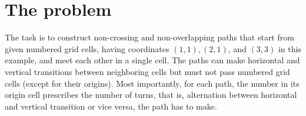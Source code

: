 \section{The problem}
The task is to construct non-crossing and non-overlapping paths that start from given numbered grid cells, having coordinates $(1,1),(2,1)$, and $(3,3)$ in this example, and meet each other in a single cell. The paths can make horizontal and vertical transitions between neighboring cells but must not pass numbered grid cells (except for their origins). Most importantly, for each path, the number in its origin cell prescribes the number of turns, that is, alternation between horizontal and vertical transition or vice versa, the path has to make. 



